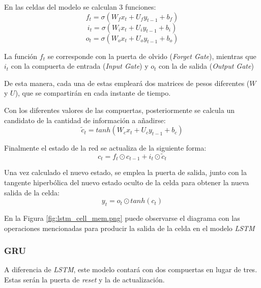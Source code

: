 En las celdas del modelo se calculan 3 funciones:
\begin{equation}
    f_t = \sigma (W_{f} x_t + U_{f} y_{t-1} + b_f)
\end{equation}
\begin{equation}
    i_t = \sigma (W_{i} x_t + U_{i} y_{t-1} + b_i)
\end{equation}
\begin{equation}    
    o_t = \sigma (W_{o} x_t + U_{o} y_{t-1} + b_o)
\end{equation}

La función \(f_t\) se corresponde con la puerta de olvido (\textit{Forget Gate}), mientras que 
\(i_t\) con la compuerta de entrada (\textit{Input Gate}) y \(o_t\) con la de salida (\textit{Output
Gate})

De esta manera, cada una de estas empleará dos matrices de pesos diferentes (\(W\) y \(U\)), que se compartirán
en cada instante de tiempo.

Con los diferentes valores de las compuertas, posteriormente se calcula un candidato de la cantidad de información
a añadirse:
\begin{equation}
    \widetilde{c}_t = tanh (W_{c} x_t + U_{c} y_{t-1} + b_c) 
\end{equation}

Finalmente el estado de la red se actualiza de la siguiente forma:
\begin{equation}
    c_t = f_t \odot  c_{t-1} + i_{t} \odot \widetilde{c}_t 
\end{equation}

Una vez calculado el nuevo estado, se emplea la puerta de salida, junto con la tangente hiperbólica
del nuevo estado oculto de la celda para obtener la nueva salida de la celda:
\begin{equation}
    y_t =  o_t \odot tanh(c_t)
\end{equation}

En la Figura \ref{fig:lstm_cell_mem.png} puede observarse el diagrama con las operaciones mencionadas
para producir la salida de la celda en el modelo \textit{LSTM}

\subsubsection{GRU}
A diferencia de \textit{LSTM}, este modelo contará con dos compuertas en lugar 
de tres. Estas serán la puerta de \textit{reset} y la de actualización.


